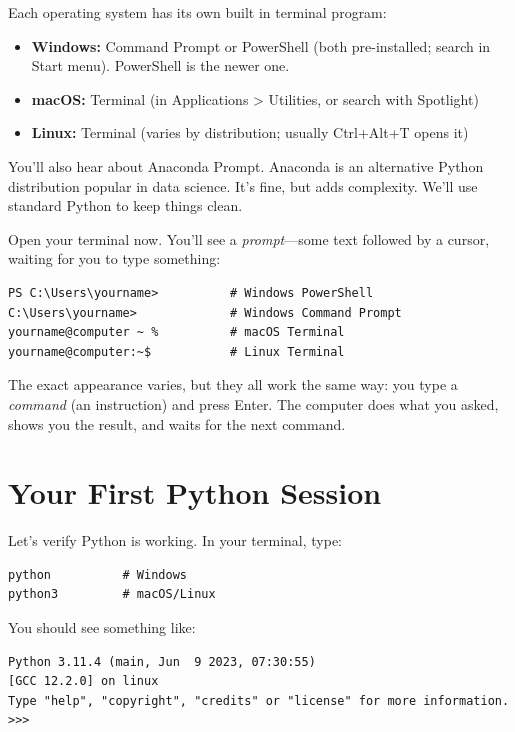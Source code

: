 Each operating system has its own built in terminal program:

\begin{itemize}
    \item \textbf{Windows:} Command Prompt or PowerShell (both pre-installed; search in Start menu). PowerShell is the newer one.
    \item \textbf{macOS:} Terminal (in Applications > Utilities, or search with Spotlight)
    \item \textbf{Linux:} Terminal (varies by distribution; usually Ctrl+Alt+T opens it)
\end{itemize}

You'll also hear about Anaconda Prompt. Anaconda is an alternative Python distribution popular in data science. It's fine, but adds complexity. We'll use standard Python to keep things clean.

Open your terminal now. You'll see a \emph{prompt}---some text followed by a cursor, waiting for you to type something:

\begin{lstlisting}[style=shellstyle]
PS C:\Users\yourname>          # Windows PowerShell
C:\Users\yourname>             # Windows Command Prompt
yourname@computer ~ %          # macOS Terminal
yourname@computer:~$           # Linux Terminal
\end{lstlisting}

The exact appearance varies, but they all work the same way: you type a \emph{command} (an instruction) and press Enter. The computer does what you asked, shows you the result, and waits for the next command.

\section{Your First Python Session}
\label{sec:first-repl}

Let's verify Python is working. In your terminal, type:

\begin{lstlisting}[style=shellstyle]
python          # Windows
python3         # macOS/Linux
\end{lstlisting}

You should see something like:

\begin{lstlisting}[style=outputstyle]
Python 3.11.4 (main, Jun  9 2023, 07:30:55)
[GCC 12.2.0] on linux
Type "help", "copyright", "credits" or "license" for more information.
>>>
\end{lstlisting}

